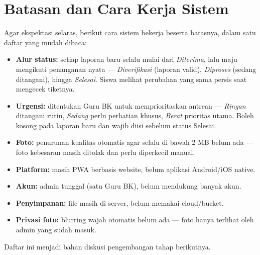 \documentclass[12pt,a4paper]{article}
\begin{document}
\section{Batasan dan Cara Kerja Sistem}
Agar ekspektasi selaras, berikut cara sistem bekerja beserta batasnya, dalam
satu daftar yang mudah dibaca:
\begin{itemize}
  \item \textbf{Alur status:} setiap laporan baru selalu mulai dari
        \textit{Diterima}, lalu maju mengikuti penanganan nyata ---
        \textit{Diverifikasi} (laporan valid), \textit{Diproses} (sedang
        ditangani), hingga \textit{Selesai}. Siswa melihat perubahan yang sama
        persis saat mengecek tiketnya.
  \item \textbf{Urgensi:} ditentukan Guru BK untuk memprioritaskan antrean ---
        \textit{Ringan} ditangani rutin, \textit{Sedang} perlu perhatian khusus,
        \textit{Berat} prioritas utama. Boleh kosong pada laporan baru dan wajib
        diisi sebelum status Selesai.
  \item \textbf{Foto:} penurunan kualitas otomatis agar selalu di bawah 2 MB
        belum ada --- foto kebesaran masih ditolak dan perlu diperkecil manual.
  \item \textbf{Platform:} masih PWA berbasis website, belum aplikasi
        Android/iOS native.
  \item \textbf{Akun:} admin tunggal (satu Guru BK), belum mendukung banyak akun.
  \item \textbf{Penyimpanan:} file masih di server, belum memakai cloud/bucket.
  \item \textbf{Privasi foto:} blurring wajah otomatis belum ada --- foto hanya
        terlihat oleh admin yang sudah masuk.
\end{itemize}
Daftar ini menjadi bahan diskusi pengembangan tahap berikutnya.
\end{document}
